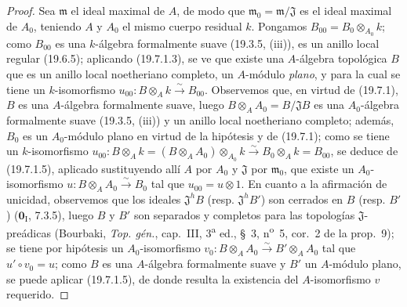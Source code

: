 
\begin{proof}
Sea $\mathfrak m$ el ideal maximal de $A$, de modo que
$\mathfrak m_0=\mathfrak m/\mathfrak J$ es el ideal maximal de $A_0$, teniendo $A$ y
$A_0$ el mismo cuerpo residual $k$. Pongamos
$B_{00}=B_0\otimes_{A_0}k$; como $B_{00}$ es una $k$-álgebra formalmente
suave (19.3.5, (iii)), es un anillo local regular (19.6.5); aplicando
(19.7.1.3), se ve que existe una $A$-álgebra topológica $B$ que es un
anillo local noetheriano completo, un $A$-módulo \emph{plano}, y para la cual se tiene un
$k$-isomorfismo
$u_{00}:B\otimes_A k\xrightarrow{\sim}B_{00}$. Observemos que, en virtud de (19.7.1),
$B$ es una $A$-álgebra formalmente suave, luego
$B\otimes_A A_0=B/\mathfrak JB$ es una $A_0$-álgebra formalmente suave
(19.3.5, (iii)) y un anillo local noetheriano completo; además, $B_0$ es un
$A_0$-módulo plano en virtud de la hipótesis y de (19.7.1); como se tiene un
$k$-isomorfismo
$u_{00}:B\otimes_A k=(B\otimes_A A_0)\otimes_{A_0}k
\xrightarrow{\sim}B_0\otimes_A k=B_{00}$,
se deduce de (19.7.1.5), aplicado sustituyendo allí $A$ por $A_0$ y
$\mathfrak J$ por $\mathfrak m_0$, que existe un $A_0$-isomorfismo
$u:B\otimes_A A_0\xrightarrow{\sim}B_0$ tal que $u_{00}=u\otimes1$. En cuanto a
la afirmación de unicidad, observemos que los ideales $\mathfrak J^hB$ (resp.
$\mathfrak J^hB'$) son cerrados en $B$ (resp. $B'$)
($\mathbf 0_{\mathrm I}$, 7.3.5), luego $B$ y $B'$ son separados y completos
para las topologías $\mathfrak J$-preádicas (Bourbaki, \emph{Top. gén.},
cap.~III, 3\textsuperscript{a} ed., §~3, n\textsuperscript{o}~5, cor.~2 de la
prop.~9); se tiene por hipótesis un $A_0$-isomorfismo
$v_0:B\otimes_A A_0\xrightarrow{\sim}B'\otimes_A A_0$ tal que
$u'\circ v_0=u$; como $B$ es una $A$-álgebra formalmente suave y $B'$ un
$A$-módulo plano, se puede aplicar (19.7.1.5), de donde resulta la existencia del
$A$-isomorfismo $v$ requerido.
\end{proof}

